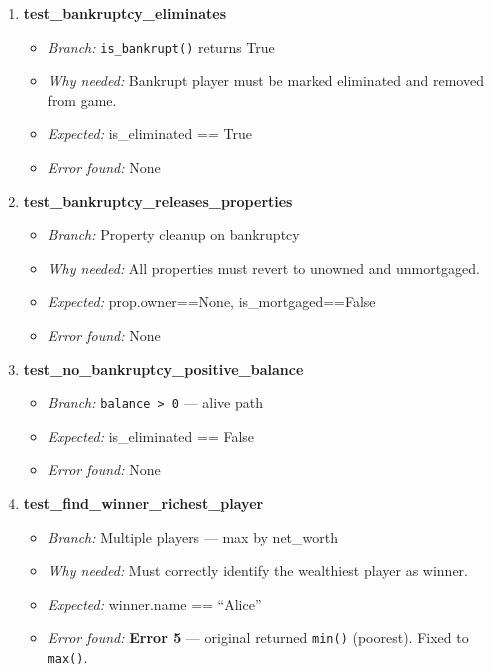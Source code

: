 \documentclass{article}
\begin{document}
\begin{enumerate}[resume, label=\textbf{TC\arabic*.}]

  \item \textbf{test\_bankruptcy\_eliminates}
  \begin{itemize}[noitemsep]
    \item \textit{Branch:} \texttt{is\_bankrupt()} returns True
    \item \textit{Why needed:} Bankrupt player must be marked eliminated and removed from game.
    \item \textit{Expected:} is\_eliminated == True
    \item \textit{Error found:} None
  \end{itemize}

  \item \textbf{test\_bankruptcy\_releases\_properties}
  \begin{itemize}[noitemsep]
    \item \textit{Branch:} Property cleanup on bankruptcy
    \item \textit{Why needed:} All properties must revert to unowned and unmortgaged.
    \item \textit{Expected:} prop.owner==None, is\_mortgaged==False
    \item \textit{Error found:} None
  \end{itemize}

  \item \textbf{test\_no\_bankruptcy\_positive\_balance}
  \begin{itemize}[noitemsep]
    \item \textit{Branch:} \texttt{balance > 0} — alive path
    \item \textit{Expected:} is\_eliminated == False
    \item \textit{Error found:} None
  \end{itemize}

  \item \textbf{test\_find\_winner\_richest\_player}
  \begin{itemize}[noitemsep]
    \item \textit{Branch:} Multiple players — max by net\_worth
    \item \textit{Why needed:} Must correctly identify the wealthiest player as winner.
    \item \textit{Expected:} winner.name == ``Alice''
    \item \textit{Error found:} \textbf{Error 5} — original returned \texttt{min()} (poorest). Fixed to \texttt{max()}.
  \end{itemize}


\end{enumerate}
\end{document}
